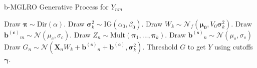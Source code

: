 \documentclass[10pt]{proc}
\newcommand*{\bias}[1]{ \bm{b^{(#1)}} }
\begin{document}
\begin{algorithm}
    \caption{b-MGLRO Generative Process for $Y_{nm}$}
    \label{alg:b-mglro-genp}
    \begin{algorithmic}[1]
        \item  Draw $\bm{\pi} \sim \text{Dir}(\alpha)$.
            \State  Draw $\bm{\sigma}_k^2 \sim \text{IG}(\alpha_0, \beta_0)$.
            \State  Draw $W_k \sim
                \mathcal{N}_f(\bm{\mu_0}, V_0 \bm{\sigma}_k^2)$.
        \EndFor
            \State  Draw $\bias{c}_m \sim
                \mathcal{N}(\mu_c, \sigma_c)$.
        \EndFor
            \State  Draw  $Z_n \sim \text{Mult}(\bm{\pi}_1, ..., \bm{\pi}_k)$.
            \State  Draw  $\bias{s}_n \sim \mathcal{N}(\mu_s, \sigma_s)$
            \State  Draw  $G_n \sim \mathcal{N}(
                    \bm{X}_n W_k + \bias{s}_n + \bias{c}, \bm{\sigma}_k^2)$.
        \EndFor
        \State  Threshold $G$ to get $Y$ using cutoffs $\bm{\gamma}$.
    \end{algorithmic}
\end{algorithm}
\end{document}
